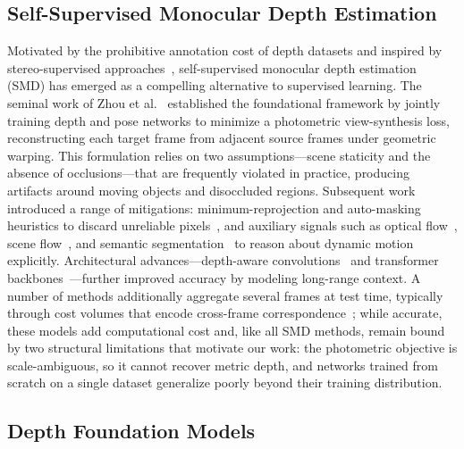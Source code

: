 \subsection{Self-Supervised Monocular Depth Estimation}

Motivated by the prohibitive annotation cost of depth datasets and inspired by stereo-supervised approaches~\cite{garg2016unsupervised, 8100182}, self-supervised monocular depth estimation (SMD) has emerged as a compelling alternative to supervised learning. The seminal work of Zhou et al.~\cite{zhou2017unsupervised} established the foundational framework by jointly training depth and pose networks to minimize a photometric view-synthesis loss, reconstructing each target frame from adjacent source frames under geometric warping. This formulation relies on two assumptions---scene staticity and the absence of occlusions---that are frequently violated in practice, producing artifacts around moving objects and disoccluded regions. Subsequent work introduced a range of mitigations: minimum-reprojection and auto-masking heuristics to discard unreliable pixels~\cite{godard2019digging}, and auxiliary signals such as optical flow~\cite{casser2019depth, chen2019self, hui2022rm, nguyen2024mining, sun2024dynamo}, scene flow~\cite{casser2019depth}, and semantic segmentation~\cite{klingner2020self} to reason about dynamic motion explicitly. Architectural advances---depth-aware convolutions~\cite{arch1, arch2} and transformer backbones~\cite{monovit, arch3, wang2024sqldepth}---further improved accuracy by modeling long-range context. A number of methods additionally aggregate several frames at test time, typically through cost volumes that encode cross-frame correspondence~\cite{watson2021temporal, woo2024prodepth}; while accurate, these models add computational cost and, like all SMD methods, remain bound by two structural limitations that motivate our work: the photometric objective is scale-ambiguous, so it cannot recover metric depth, and networks trained from scratch on a single dataset generalize poorly beyond their training distribution.

\subsection{Depth Foundation Models}

